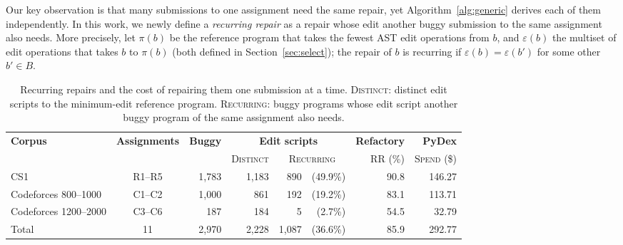 \documentclass[acmsmall,screen,review,anonymous,nonacm]{acmart}
\begin{document}
Our key observation is that many submissions to one assignment need the same repair, yet Algorithm~\ref{alg:generic} derives each of them independently. In this work, we newly define a \emph{recurring repair} as a repair whose edit another buggy submission to the same assignment also needs. More precisely, let $\pi(b)$ be the reference program that takes the fewest AST edit operations from $b$, and $\varepsilon(b)$ the multiset of edit operations that takes $b$ to $\pi(b)$ (both defined in Section~\ref{sec:select}); the repair of $b$ is recurring if $\varepsilon(b) = \varepsilon(b')$ for some other $b' \in B$.

\begin{table}[t]
\caption{Recurring repairs and the cost of repairing them one submission at a time. \textsc{Distinct}: distinct edit scripts to the minimum-edit reference program. \textsc{Recurring}: buggy programs whose edit script another buggy program of the same assignment also needs.}
\label{tab:limit}
\centering
\small
\setlength{\tabcolsep}{4.5pt}
\begin{tabular}{l|c||r|r|rr||r|r}
\toprule
\multirow{2}{*}{\textbf{Corpus}} & \multirow{2}{*}{\textbf{Assignments}} & \multirow{2}{*}{\textbf{Buggy}} & \multicolumn{3}{c||}{\textbf{Edit scripts}} & \textbf{Refactory} & \textbf{PyDex} \\
\cline{4-8}
 & & & \textsc{Distinct} & \multicolumn{2}{c||}{\textsc{Recurring}} & \textsc{RR} (\%) & \textsc{Spend} (\$) \\
\midrule\midrule
CS1 & R1--R5 & 1,783 & 1,183 & 890 & (49.9\%) & 90.8 & 146.27 \\
Codeforces 800--1000 & C1--C2 & 1,000 & 861 & 192 & (19.2\%) & 83.1 & 113.71 \\
Codeforces 1200--2000 & C3--C6 & 187 & 184 & 5 & (2.7\%) & 54.5 & 32.79 \\
\midrule
Total & 11 & 2,970 & 2,228 & 1,087 & (36.6\%) & 85.9 & 292.77 \\
\bottomrule
\end{tabular}
\end{table}
\end{document}

